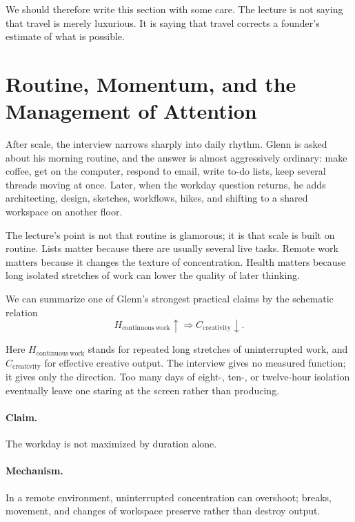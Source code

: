 We should therefore write this section with some care. The lecture is not saying that travel is merely luxurious. It is saying that travel corrects a founder's estimate of what is possible.

\section{Routine, Momentum, and the Management of Attention}

After scale, the interview narrows sharply into daily rhythm. Glenn is asked about his morning routine, and the answer is almost aggressively ordinary: make coffee, get on the computer, respond to email, write to-do lists, keep several threads moving at once. Later, when the workday question returns, he adds architecting, design, sketches, workflows, hikes, and shifting to a shared workspace on another floor.

The lecture's point is not that routine is glamorous; it is that scale is built on routine. Lists matter because there are usually several live tasks. Remote work matters because it changes the texture of concentration. Health matters because long isolated stretches of work can lower the quality of later thinking.

We can summarize one of Glenn's strongest practical claims by the schematic relation
\begin{equation}
H_{\mathrm{continuous\ work}}\uparrow \Longrightarrow C_{\mathrm{creativity}}\downarrow.
\end{equation}

Here \(H_{\mathrm{continuous\ work}}\) stands for repeated long stretches of uninterrupted work, and \(C_{\mathrm{creativity}}\) for effective creative output. The interview gives no measured function; it gives only the direction. Too many days of eight-, ten-, or twelve-hour isolation eventually leave one staring at the screen rather than producing.

\paragraph{Claim.} The workday is not maximized by duration alone.

\paragraph{Mechanism.} In a remote environment, uninterrupted concentration can overshoot; breaks, movement, and changes of workspace preserve rather than destroy output.

